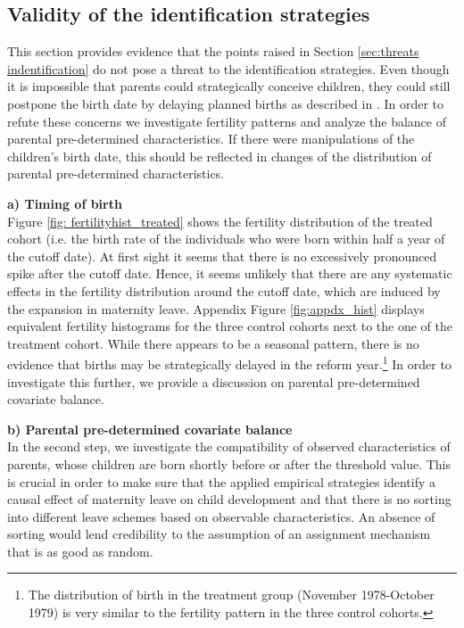 \documentclass[a4paper ]{article}
\begin{document}
\subsection{Validity of the identification strategies}\label{sec: validity}
This section provides evidence that the points raised in Section \ref{sec:threats indentification} do not pose a threat to the identification strategies. Even though it is impossible that parents could strategically conceive children, they could still postpone the birth date by delaying planned births as described in \cite{lalive2013parental}. In order to refute these concerns we investigate fertility patterns and analyze the balance of parental pre-determined characteristics. If there were manipulations of the children's birth date, this should be reflected in changes of the distribution of parental pre-determined characteristics.\newline


\textbf{a) Timing of birth}\\
Figure \ref{fig: fertilityhist_treated} shows the fertility distribution of the treated cohort (i.e. the birth rate of the individuals who were born within half a year of the cutoff date). At first sight it seems that there is no excessively pronounced spike after the cutoff date. Hence, it seems unlikely that there are any systematic effects in the fertility distribution around the cutoff date, which are induced by the expansion in maternity leave. Appendix Figure \ref{fig:appdx_hist} displays equivalent fertility histograms for the three control cohorts next to the one of the treatment cohort. While there appears to be a seasonal pattern, there is no evidence that births may be strategically delayed in the reform year.\footnote{The distribution of birth in the treatment group (November 1978-October 1979) is very similar to the fertility pattern in the three control cohorts.}  \newline
In order to investigate this further, we provide a discussion on parental pre-determined covariate balance.



\bigskip
\textbf{b) Parental pre-determined covariate balance}\\
In the second step, we investigate the compatibility of observed characteristics of parents, whose children are born shortly before or after the threshold value. This is crucial in order to make sure that the applied empirical strategies identify a causal effect of maternity leave on child development and that there is no sorting into different leave schemes based on observable characteristics. An absence of sorting would lend credibility to the assumption of an assignment mechanism that is as good as random.  \newline
\end{document}
